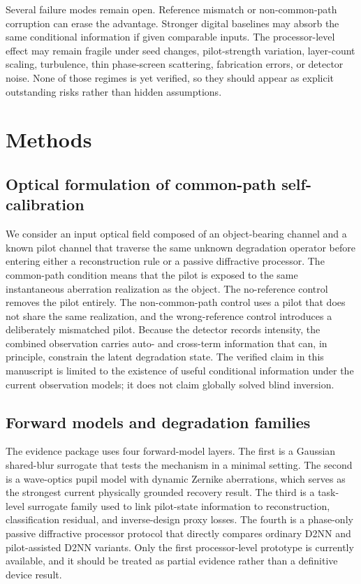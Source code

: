 \documentclass[11pt]{article}
\begin{document}
Several failure modes remain open. Reference mismatch or non-common-path corruption can erase the advantage. Stronger digital baselines may absorb the same conditional information if given comparable inputs. The processor-level effect may remain fragile under seed changes, pilot-strength variation, layer-count scaling, turbulence, thin phase-screen scattering, fabrication errors, or detector noise. None of those regimes is yet verified, so they should appear as explicit outstanding risks rather than hidden assumptions.

\section{Methods}
\subsection{Optical formulation of common-path self-calibration}
We consider an input optical field composed of an object-bearing channel and a known pilot channel that traverse the same unknown degradation operator before entering either a reconstruction rule or a passive diffractive processor. The common-path condition means that the pilot is exposed to the same instantaneous aberration realization as the object. The no-reference control removes the pilot entirely. The non-common-path control uses a pilot that does not share the same realization, and the wrong-reference control introduces a deliberately mismatched pilot. Because the detector records intensity, the combined observation carries auto- and cross-term information that can, in principle, constrain the latent degradation state. The verified claim in this manuscript is limited to the existence of useful conditional information under the current observation models; it does not claim globally solved blind inversion.

\subsection{Forward models and degradation families}
The evidence package uses four forward-model layers. The first is a Gaussian shared-blur surrogate that tests the mechanism in a minimal setting. The second is a wave-optics pupil model with dynamic Zernike aberrations, which serves as the strongest current physically grounded recovery result. The third is a task-level surrogate family used to link pilot-state information to reconstruction, classification residual, and inverse-design proxy losses. The fourth is a phase-only passive diffractive processor protocol that directly compares ordinary D2NN and pilot-assisted D2NN variants. Only the first processor-level prototype is currently available, and it should be treated as partial evidence rather than a definitive device result.
\end{document}
